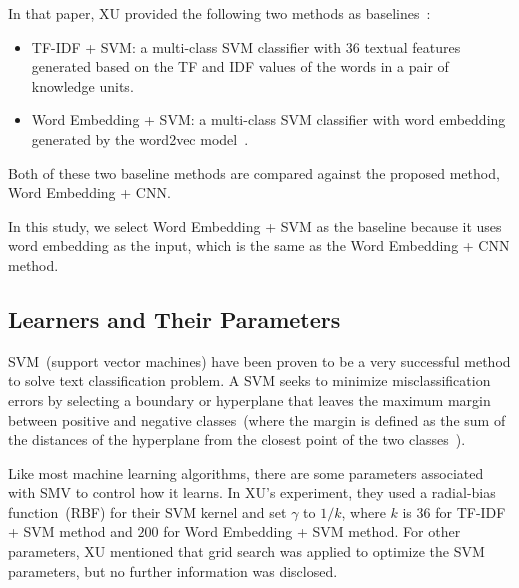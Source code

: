 \documentclass[sigconf,review, anonymous]{acmart}
\theoremstyle{break}
\newcommand{\bi}{\begin{itemize}[leftmargin=0.4cm]}
\newcommand{\ei}{\end{itemize}}
\begin{document}
In that paper, XU provided the following two methods as baselines~\cite{xu2016predicting}:

\bi
\item TF-IDF + SVM: a multi-class SVM classifier with  36 textual features generated  based on the 
TF and IDF values of the words in a pair of knowledge units. 
\item Word Embedding + SVM:  a multi-class SVM classifier with word embedding generated by the word2vec model~\cite{mikolov2013distributed}.
\ei
Both of these two baseline methods are compared against the proposed method, Word Embedding + CNN. 

In this study, we select  Word Embedding + SVM as the baseline because it uses word embedding as the input,
which is the same as the Word Embedding + CNN method.




\subsection{Learners and Their Parameters}
SVM~(support vector machines) have been proven to be a very successful method to solve
text classification problem. A SVM  seeks to minimize misclassification
errors by selecting a boundary or hyperplane that leaves
the maximum margin between positive and negative classes~(where the
margin is defined as the sum of the distances of the
hyperplane from the closest point of the two classes~\cite{joachims1998text}).

Like most machine learning algorithms, there are some parameters associated with
SMV to control how it learns.  In XU's experiment, they used a radial-bias function~(RBF) for their SVM kernel
and set $\gamma$ to $1/k$, where $k$ is $36$ for TF-IDF + SVM method
and $200$ for Word Embedding + SVM method. For other parameters, 
XU mentioned that grid search was applied to optimize the SVM parameters, 
but no further information was disclosed. 
\end{document}
